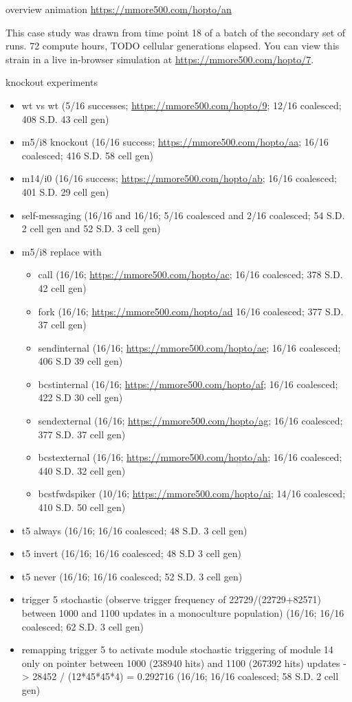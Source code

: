 

overview animation \url{https://mmore500.com/hopto/an}

This case study was drawn from time point 18 of a batch of the secondary set of runs.
72 compute hours, TODO cellular generations elapsed.
You can view this strain in a live in-browser simulation at \url{https://mmore500.com/hopto/7}.

knockout experiments
\begin{itemize}
  \item wt vs wt (5/16 successes; \url{https://mmore500.com/hopto/9}; 12/16 coalesced; 408 S.D. 43 cell gen)
  \item m5/i8 knockout (16/16 success; \url{https://mmore500.com/hopto/aa}; 16/16 coalesced; 416 S.D. 58 cell gen)
  \item m14/i0 (16/16 success; \url{https://mmore500.com/hopto/ab}; 16/16 coalesced; 401 S.D. 29 cell gen)
  \item self-messaging (16/16 and 16/16; 5/16 coalesced and 2/16 coalesced; 54 S.D. 2 cell gen and 52 S.D. 3 cell gen)
  \item m5/i8 replace with
  \begin{itemize}
	\item call (16/16; \url{https://mmore500.com/hopto/ac}; 16/16 coalesced; 378 S.D. 42 cell gen)
    \item fork (16/16; \url{https://mmore500.com/hopto/ad} 16/16 coalesced; 377 S.D. 37 cell gen)
    \item sendinternal (16/16; \url{https://mmore500.com/hopto/ae}; 16/16 coalesced; 406 S.D 39 cell gen)
    \item bcstinternal (16/16; \url{https://mmore500.com/hopto/af}; 16/16 coalesced; 422 S.D 30 cell gen)
    \item sendexternal (16/16; \url{https://mmore500.com/hopto/ag}; 16/16 coalesced; 377 S.D. 37 cell gen)
    \item bcstexternal (16/16; \url{https://mmore500.com/hopto/ah}; 16/16 coalesced; 440 S.D. 32 cell gen)
    \item bcstfwdspiker (10/16; \url{https://mmore500.com/hopto/ai}; 14/16 coalesced; 410 S.D. 50 cell gen)
  \end{itemize}
  \item t5 always (16/16; 16/16 coalesced; 48 S.D. 3 cell gen)
  \item t5 invert (16/16; 16/16 coalesced; 48 S.D 3 cell gen)
  \item t5 never (16/16; 16/16 coalesced; 52 S.D. 3 cell gen)
  \item trigger 5 stochastic (observe trigger frequency of 22729/(22729+82571) between 1000 and 1100 updates in a monoculture population) (16/16; 16/16 coalesced; 62 S.D. 3 cell gen)
  \item remapping trigger 5 to activate module stochastic triggering of module 14 only on pointer between 1000 (238940 hits) and 1100 (267392 hits) updates -> 28452 / (12*45*45*4) = 0.292716 (16/16; 16/16 coalesced; 58 S.D. 2 cell gen)
\end{itemize}



